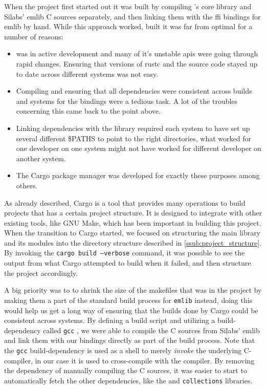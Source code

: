 When the project first started out it was built by compiling {\rust}'s core library and Silabs' emlib C sources separately, and then linking them with the \gls{ffi} bindings for emlib by hand.
While this approach worked, built it was far from optimal for a number of reasons:

\begin{itemize}
    \item {\rust} was in active development and many of it's unstable \glspl{api} were going through rapid changes. Ensuring that versions of rustc and the {\rust} source code stayed up to date across different systems was not easy.
    \item Compiling and ensuring that all dependencies were consistent across builds and systems for the bindings were a tedious task. A lot of the troubles concerning this came back to the point above.
    \item Linking dependencies with the library required each system to have set up several different \$PATHS to point to the right directories, what worked for one developer on one system might not have worked for different developer on another system.
    \item The Cargo package manager was developed for exactly these purposes among others.
\end{itemize}

As already described, Cargo is a tool that provides many operations to build {\rust} projects that has a certain project structure.
It is designed to integrate with other existing tools, like GNU Make, which has been important in  building this project.
When the transition to Cargo started, we focused on structuring the main library and its modules into the directory structure described in \autoref{ssub:project_structure}.
By invoking the \texttt{cargo build --verbose} command, it was possible to see the output from what Cargo attempted to build when it failed, and then structure the project accordingly.

A big priority was to to shrink the size of the makefiles that was in the project by making them a part of the standard build process for \texttt{emlib} instead, doing this would help us get a long way of ensuring that the builds done by Cargo could be consistent across systems.
By defining a {\rust} build script and utilizing a {\rust} build-dependency called \texttt{gcc} \cite{web:cargo_gcc}, we were able to compile the C sources from Silabs' emlib and link them with our bindings directly as part of the build process.
Note that the \texttt{gcc} build-dependency is used as a shell to merely \emph{invoke} the underlying C-compiler, in our case it is used to cross-compile with the {\armgcc} compiler.
By removing the dependency of manually compiling the C sources, it was easier to start to automatically fetch the other dependencies, like the {\core} and \texttt{collections} libraries.

